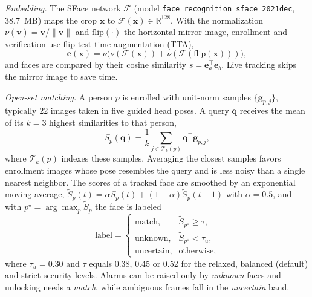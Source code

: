 \documentclass[journal]{IEEEtran}
\begin{document}
\emph{Embedding.} The SFace network $\mathcal{F}$ (model \texttt{face\_recognition\_sface\_2021dec}, 38.7~MB) maps the crop $\mathbf{x}$ to $\mathcal{F}(\mathbf{x})\in\mathbb{R}^{128}$. With the normalization $\nu(\mathbf{v})=\mathbf{v}/\lVert\mathbf{v}\rVert$ and $\mathrm{flip}(\cdot)$ the horizontal mirror image, enrollment and verification use flip test-time augmentation (TTA),
\begin{equation}
\mathbf{e}(\mathbf{x}) = \nu\bigl(\nu(\mathcal{F}(\mathbf{x}))+\nu(\mathcal{F}(\mathrm{flip}(\mathbf{x})))\bigr),
\end{equation}
and faces are compared by their cosine similarity $s=\mathbf{e}_a^\top\mathbf{e}_b$. Live tracking skips the mirror image to save time.

\emph{Open-set matching.} A person $p$ is enrolled with unit-norm samples $\{\mathbf{g}_{p,j}\}$, typically 22 images taken in five guided head poses. A query $\mathbf{q}$ receives the mean of its $k=3$ highest similarities to that person,
\begin{equation}
S_p(\mathbf{q})=\frac{1}{k}\sum_{j\in\mathcal{T}_k(p)}\mathbf{q}^\top\mathbf{g}_{p,j},
\end{equation}
where $\mathcal{T}_k(p)$ indexes these samples. Averaging the closest samples favors enrollment images whose pose resembles the query and is less noisy than a single nearest neighbor. The scores of a tracked face are smoothed by an exponential moving average, $\tilde{S}_p(t)=\alpha S_p(t)+(1-\alpha)\tilde{S}_p(t-1)$ with $\alpha=0.5$, and with $p^\star=\arg\max_p\tilde{S}_p$ the face is labeled
\begin{equation}
\text{label}=\begin{cases}
\text{match}, & \tilde{S}_{p^\star}\ge\tau,\\
\text{unknown}, & \tilde{S}_{p^\star}<\tau_u,\\
\text{uncertain}, & \text{otherwise,}
\end{cases}
\end{equation}
where $\tau_u=0.30$ and $\tau$ equals 0.38, 0.45 or 0.52 for the relaxed, balanced (default) and strict security levels. Alarms can be raised only by \emph{unknown} faces and unlocking needs a \emph{match}, while ambiguous frames fall in the \emph{uncertain} band.
\end{document}
